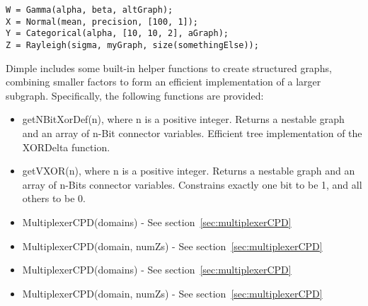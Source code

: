 \begin{lstlisting}
W = Gamma(alpha, beta, altGraph);
X = Normal(mean, precision, [100, 1]);
Y = Categorical(alpha, [10, 10, 2], aGraph);
Z = Rayleigh(sigma, myGraph, size(somethingElse));
\end{lstlisting}

\fi


Dimple includes some built-in helper functions to create structured graphs, combining smaller factors to form an efficient implementation of a larger subgraph.  Specifically, the following functions are provided:

\ifmatlab
\begin{itemize}
\item getNBitXorDef(n), where n is a positive integer. Returns a nestable graph and an array of n-Bit connector variables. Efficient tree implementation of the XORDelta function.
\item getVXOR(n), where n is a positive integer. Returns a nestable graph and an array of n-Bits connector variables. Constrains exactly one bit to be 1, and all others to be 0.
\item MultiplexerCPD(domains) - See section~\ref{sec:multiplexerCPD}
\item MultiplexerCPD(domain, numZs) - See section~\ref{sec:multiplexerCPD}
\end{itemize}
\fi

\ifjava
\begin{itemize}
\item MultiplexerCPD(domains) - See section~\ref{sec:multiplexerCPD}
\item MultiplexerCPD(domain, numZs) - See section~\ref{sec:multiplexerCPD}
\end{itemize}
\fi

